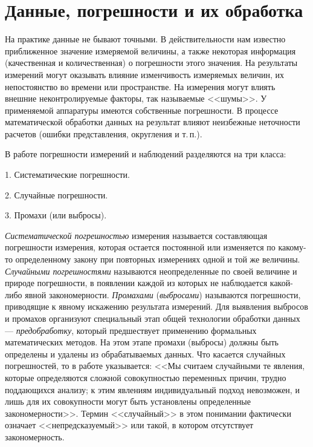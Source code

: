 \documentclass[a5paper,openany]{book}
\begin{document}
{	\section{Данные, погрешности и их обработка} 


На практике данные не бывают точными. В действительности нам известно приближенное
значение измеряемой величины, а также некоторая информация (качественная 
и количественная) о погрешности этого значения.   
На результаты измерений могут оказывать влияние изменчивость измеряемых величин, 
их непостоянство во времени или пространстве. На измерения могут влиять внешние неконтролируемые факторы, так 
называемые <<шумы>>. 
У применяемой аппаратуры имеются собственные погрешности. 
В процессе математической обработки данных на результат влияют
неизбежные неточности расчетов (ошибки представления,  округления и т.\,п.). 

В работе \cite{Malikov} погрешности измерений и наблюдений разделяются на три класса: 
\begin{list}{}{\leftmargin=10mm\itemsep=5pt\topsep=3pt\parsep=0pt} 
	\item [1.] 
	Систематические погрешности. 
	\item[2.] 
	Случайные погрешности. 
	\item[3.] 
	Промахи (или выбросы).  
\end{list} 

\emph{Систематической погрешностью} измерения называется составляющая погрешности 
измерения, которая остается постоянной или изменяется по какому-то определенному 
закону при повторных измерениях одной и той же величины. \emph{Случайными погрешностями} 
называются неопределенные по своей величине и природе погрешности, в появлении каждой 
из которых не наблюдается какой-либо явной закономерности. 
\emph{Промахами} (\emph{выбросами}) называются погрешности, приводящие к явному 
искажению результата измерений. 
Для выявления выбросов и промахов организуют специальный этап общей технологии 
обработки данных --- \emph{предобработку}, который предшествует применению формальных 
математических методов. На этом этапе промахи (выбросы)   должны быть определены и удалены 
из обрабатываемых данных.                
Что касается случайных погрешностей, то в работе \cite{Malikov} указывается: <<Мы считаем случайными те явления, которые определяются сложной совокупностью переменных 
причин, трудно поддающихся анализу; к этим явлениям индивидуальный подход невозможен, 
и лишь для их совокупности могут быть установлены определенные закономерности>>. 
Термин <<случайный>> в этом понимании  фактически означает <<непредсказуемый>> или такой, в котором отсутствует закономерность. 

}
\end{document}
